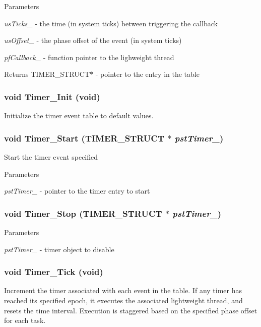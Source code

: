 \begin{DoxyParams}{Parameters}
\item[{\em usTicks\_\-}]-\/ the time (in system ticks) between triggering the callback \item[{\em usOffset\_\-}]-\/ the phase offset of the event (in system ticks) \item[{\em pfCallback\_\-}]-\/ function pointer to the lighweight thread \end{DoxyParams}
\begin{DoxyReturn}{Returns}
TIMER\_\-STRUCT$\ast$ -\/ pointer to the entry in the table 
\end{DoxyReturn}
\subsubsection[{Timer\_\-Init}]{\setlength{\rightskip}{0pt plus 5cm}void Timer\_\-Init (void)}\label{timer_8c_a92a70e2775796b1a7a6b49a983f570e3}
Initialize the timer event table to default values. 
\subsubsection[{Timer\_\-Start}]{\setlength{\rightskip}{0pt plus 5cm}void Timer\_\-Start ({\bf TIMER\_\-STRUCT} $\ast$ {\em pstTimer\_\-})}\label{timer_8c_a8940870986e55ac6eb91b4c4622fad9f}
Start the timer event specified


\begin{DoxyParams}{Parameters}
\item[{\em pstTimer\_\-}]-\/ pointer to the timer entry to start \end{DoxyParams}
\subsubsection[{Timer\_\-Stop}]{\setlength{\rightskip}{0pt plus 5cm}void Timer\_\-Stop ({\bf TIMER\_\-STRUCT} $\ast$ {\em pstTimer\_\-})}\label{timer_8c_a3771dd9a10f4f062cfe98adac397a659}

\begin{DoxyParams}{Parameters}
\item[{\em pstTimer\_\-}]-\/ timer object to disable \end{DoxyParams}
\subsubsection[{Timer\_\-Tick}]{\setlength{\rightskip}{0pt plus 5cm}void Timer\_\-Tick (void)}\label{timer_8c_ad5cae198aa59d9eafa2285e6f681e3b9}
Increment the timer associated with each event in the table. If any timer has reached its specified epoch, it executes the associated lightweight thread, and resets the time interval. Execution is staggered based on the specified phase offset for each task. 